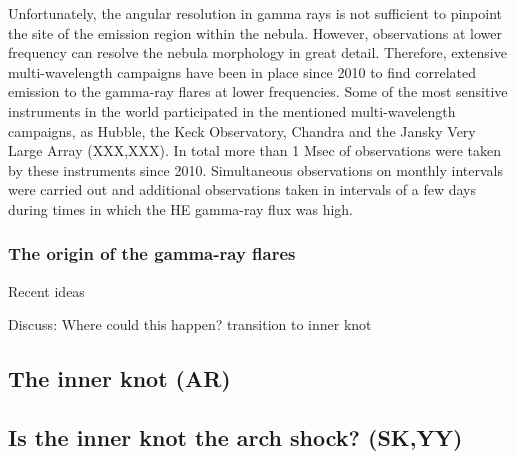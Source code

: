 Unfortunately, the angular resolution in gamma rays is not sufficient to pinpoint the site of the emission region within the nebula. However, observations at lower frequency can resolve the nebula morphology in great detail. Therefore, extensive multi-wavelength campaigns have been in place since 2010 to find correlated emission to the gamma-ray flares at lower frequencies. Some of the most sensitive instruments in the world participated in the mentioned multi-wavelength campaigns, as Hubble, the Keck Observatory, Chandra and the Jansky Very Large Array (XXX,XXX). In total more than 1 Msec of observations were taken by these  instruments since 2010. Simultaneous observations on monthly intervals were carried out and additional observations taken in intervals of a few days during times in which the HE gamma-ray flux was high.

\subsubsection{The origin of the gamma-ray flares}

Recent ideas  \cite{2016arXiv160403179Y}\cite{2015arXiv151205426Z}\cite{2016arXiv160304850N}\cite{2016arXiv160305731L}

Discuss: Where could this happen? transition to inner knot

\subsection{The inner knot   (AR)}
\subsection{Is the inner knot the arch shock?                                      (SK,YY)}
